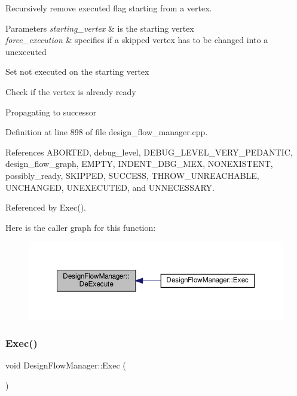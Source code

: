 Recursively remove executed flag starting from a vertex. 


\begin{DoxyParams}{Parameters}
{\em starting\+\_\+vertex} & is the starting vertex \\
\hline
{\em force\+\_\+execution} & specifies if a skipped vertex has to be changed into a unexecuted \\
\hline
\end{DoxyParams}
Set not executed on the starting vertex

Check if the vertex is already ready

Propagating to successor 

Definition at line 898 of file design\+\_\+flow\+\_\+manager.\+cpp.



References A\+B\+O\+R\+T\+ED, debug\+\_\+level, D\+E\+B\+U\+G\+\_\+\+L\+E\+V\+E\+L\+\_\+\+V\+E\+R\+Y\+\_\+\+P\+E\+D\+A\+N\+T\+IC, design\+\_\+flow\+\_\+graph, E\+M\+P\+TY, I\+N\+D\+E\+N\+T\+\_\+\+D\+B\+G\+\_\+\+M\+EX, N\+O\+N\+E\+X\+I\+S\+T\+E\+NT, possibly\+\_\+ready, S\+K\+I\+P\+P\+ED, S\+U\+C\+C\+E\+SS, T\+H\+R\+O\+W\+\_\+\+U\+N\+R\+E\+A\+C\+H\+A\+B\+LE, U\+N\+C\+H\+A\+N\+G\+ED, U\+N\+E\+X\+E\+C\+U\+T\+ED, and U\+N\+N\+E\+C\+E\+S\+S\+A\+RY.



Referenced by Exec().

Here is the caller graph for this function\+:
\nopagebreak
\begin{figure}[H]
\begin{center}
\leavevmode
\includegraphics[width=350pt]{de/d63/classDesignFlowManager_ac61f3e68a4afd29ca8c5667eb4fc3e81_icgraph}
\end{center}
\end{figure}
\mbox{\label{classDesignFlowManager_ae33babf44b5caddeafba01e7fa22bcd4}} 
\subsubsection{\texorpdfstring{Exec()}{Exec()}}
{\footnotesize\ttfamily void Design\+Flow\+Manager\+::\+Exec (\begin{DoxyParamCaption}{ }\end{DoxyParamCaption})\hspace{0.3cm}{\ttfamily [virtual]}}



